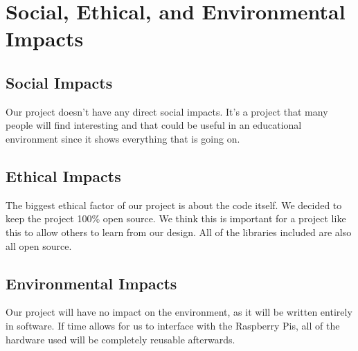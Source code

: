 \documentclass[conference]{IEEEtran}
\begin{document}
\section{Social, Ethical, and Environmental Impacts} 

\subsection{Social Impacts}

Our project doesn't have any direct social impacts. It's a project that many people will find interesting and that could be useful in an educational environment since it shows everything that is going on.

\subsection{Ethical Impacts}

The biggest ethical factor of our project is about the code itself. We decided to keep the project 100\% open source. We think this is important for a project like this to allow others to learn from our design. All of the libraries included are also all open source.

\subsection{Environmental Impacts}

Our project will have no impact on the environment, as it will be written entirely in software. If time allows for us to interface with the Raspberry Pis, all of the hardware used will be completely reusable afterwards.
\end{document}
